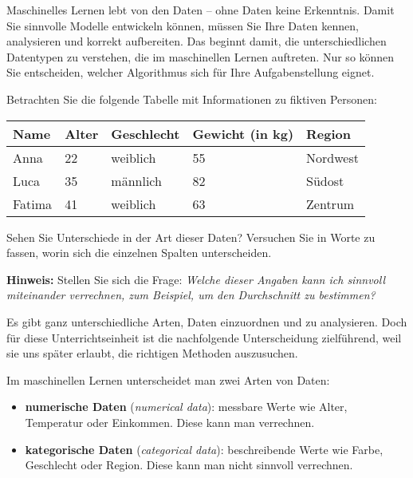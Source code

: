 \begin{lpu}

Maschinelles Lernen lebt von den Daten – ohne Daten keine Erkenntnis. Damit Sie sinnvolle Modelle entwickeln k\"onnen, m\"ussen Sie Ihre Daten kennen, analysieren und korrekt aufbereiten. Das beginnt damit, die unterschiedlichen Datentypen zu verstehen, die im maschinellen Lernen auftreten. Nur so k\"onnen Sie entscheiden, welcher Algorithmus sich f\"ur Ihre Aufgabenstellung eignet.

\begin{aufgabe}{1}
Betrachten Sie die folgende Tabelle mit Informationen zu fiktiven Personen: \vspace{0.5em}

\begin{center}
\begin{tabular}{|l|l|l|l|l|}
\hline
\textbf{Name} & \textbf{Alter} & \textbf{Geschlecht} & \textbf{Gewicht (in kg)} & \textbf{Region} \\
\hline
Anna   & 22    & weiblich  & 55   & Nordwest \\
Luca   & 35    & m\"annlich & 82   & S\"udost \\
Fatima & 41    & weiblich  & 63  & Zentrum \\
\hline
\end{tabular}
\end{center}

Sehen Sie Unterschiede in der Art dieser Daten? Versuchen Sie in Worte zu fassen, worin sich die einzelnen Spalten unterscheiden.

\textbf{Hinweis:} Stellen Sie sich die Frage: \textit{Welche dieser Angaben kann ich sinnvoll miteinander verrechnen, zum Beispiel, um den Durchschnitt zu bestimmen?}
\end{aufgabe}

Es gibt ganz unterschiedliche Arten, Daten einzuordnen und zu analysieren. Doch für diese Unterrichtseinheit ist die nachfolgende Unterscheidung zielführend, weil sie uns später erlaubt, die richtigen Methoden auszusuchen.

\begin{theorie}
Im maschinellen Lernen unterscheidet man zwei Arten von Daten:
\begin{itemize}
  \item \textbf{numerische Daten} (\emph{numerical data}): messbare Werte wie Alter, Temperatur oder Einkommen. Diese kann man verrechnen.
  \item \textbf{kategorische Daten} (\emph{categorical data}): beschreibende Werte wie Farbe, Geschlecht oder Region. Diese kann man nicht sinnvoll verrechnen.
\end{itemize}
\end{theorie}


\end{lpu}
